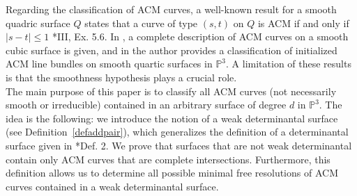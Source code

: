 \documentclass[12pt,reqno]{amsart}
\theoremstyle{plain}
\theoremstyle{definition}
\theoremstyle{remark}
\theoremstyle{definition}
\newcommand{\PP}{\mathds{P}}
\newcommand{\PPP}{\PP^{3}}
\begin{document}
Regarding the classification of ACM curves, a well-known result for a smooth quadric surface $Q$ states that a curve of type $(s,t)$ on $Q$ is ACM if and only if $|s-t|\leq 1$ \cite{har2}*{III, Ex. 5.6}. In \cite{mwa}, a complete description of ACM curves on a smooth cubic surface is given, and in \cite{kwa} the author provides a classification of initialized ACM line bundles on smooth quartic surfaces in $\PPP$. A limitation of these results is that the smoothness hypothesis plays a crucial role.\\

The main purpose of this paper is to classify all ACM curves (not necessarily smooth or irreducible) contained in an arbitrary surface of degree $d$ in $\PPP$. The idea is the following: we introduce the notion of a weak determinantal surface (see Definition~\ref{defaddpair}), which generalizes the definition of a determinantal surface given in \cite{LLV}*{Def. 2}. We prove that surfaces that are not weak determinantal contain only ACM curves that are complete intersections. Furthermore, this definition allows us to determine all possible minimal free resolutions of ACM curves contained in a weak determinantal surface.\\
\end{document}
